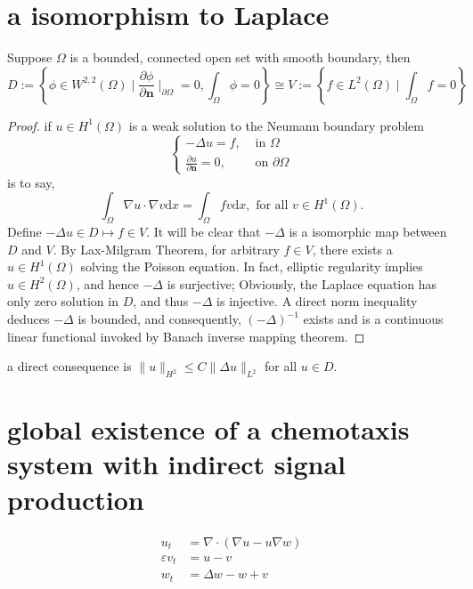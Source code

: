 \section{a isomorphism to Laplace}
\begin{theorem}
Suppose $\Omega$ is a bounded, connected open set with smooth boundary, then
\begin{equation}
D := \left\{\phi\in W^{2,2}(\Omega)\mid \frac{\partial \phi}{\partial \boldsymbol{n}}\mid_{\partial\Omega} = 0, \int_\Omega\phi=0\right\}
\cong V :=\left\{f\in L^2(\Omega)\mid \int_\Omega f = 0\right\}
\end{equation}
\end{theorem}
\begin{proof}
if $u\in H^1(\Omega)$ is a weak solution to the Neumann boundary problem 
\begin{equation*}
\left\{
\begin{array}{ll}
-\Delta u =f, & \text{ in } \Omega\\
\frac{\partial u}{\partial \boldsymbol{n}} = 0, & \text{ on } \partial\Omega
\end{array}\right.
\end{equation*}
is to say, 
\begin{equation*}
\int_\Omega\nabla u\cdot\nabla v\mathrm{d}x = \int_\Omega fv\mathrm{d}x,\text{ for all } v\in H^1(\Omega).
\end{equation*}
Define $-\Delta u\in D \mapsto f\in V$. It will be clear that $-\Delta$ is a isomorphic map between $D$ and $V$.
By Lax-Milgram Theorem, for arbitrary $f\in V$, there exists a $u\in H^1(\Omega)$ solving the Poisson equation. In fact, elliptic regularity implies $u\in H^2(\Omega)$, and hence 
$-\Delta$ is surjective; Obviously, the Laplace equation has only zero solution in $D$, and thus $-\Delta$ is injective. A direct norm inequality deduces $-\Delta$ is bounded, and consequently, $(-\Delta)^{-1}$ exists and is a continuous linear functional invoked by Banach inverse mapping theorem.
\end{proof}
\begin{example}
a direct consequence is $\|u\|_{H^2}\leq C\|\Delta u\|_{L^2}$ for all $u\in D$.
\end{example}


\section{global existence of a chemotaxis system with indirect signal production}
\begin{align}\label{sys: ks with isp}
  u_t &= \nabla\cdot(\nabla u - u\nabla w) \\
  \varepsilon v_t &= u - v \\
  w_t &= \Delta w - w + v
\end{align}

